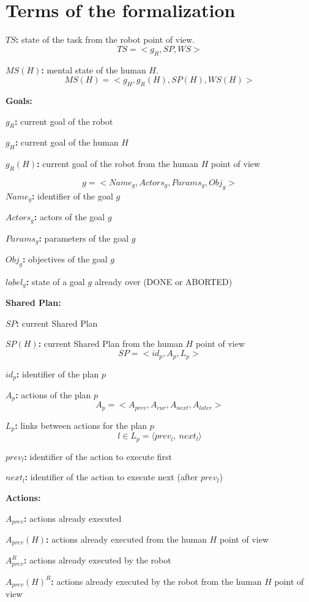 \chapter{Terms of the formalization}
\label{chap:annexe1}


\textbf{$TS$:} state of the task from the robot point of view.
$$TS = <g_R, SP, WS>$$

\textbf{$MS(H)$:} mental state of the human $H$.
$$MS(H) = <g_H, g_R(H), SP(H), WS(H)>$$

\textbf{Goals:}

\textbf{$g_R$:} current goal of the robot

\textbf{$g_H$:} current goal of the human $H$

\textbf{$g_R(H)$:} current goal of the robot from the human $H$ point of view

$$g = <Name_g, Actors_g, Params_g, Obj_g>$$
\textbf{$Name_g$:} identifier of the goal $g$

\textbf{$Actors_g$:} actors of the goal $g$

\textbf{$Params_g$:} parameters of the goal $g$

\textbf{$Obj_g$:} objectives of the goal $g$

\textbf{$label_g$:} state of a goal $g$ already over (DONE or ABORTED)


\textbf{Shared Plan:}

\textbf{$SP$:} current Shared Plan

\textbf{$SP(H)$:} current Shared Plan from the human $H$ point of view
$$SP = <id_p, A_p, L_p>$$

\textbf{$id_p$:} identifier of the plan $p$

\textbf{$A_p$:} actions of the plan $p$
$$A_p = <A_{prev}, A_{cur}, A_{next}, A_{later}>$$

\textbf{$L_p$:} links between actions for the plan $p$
 $$l \in L_p = \langle prev_l, \ next_l \rangle$$

\textbf{$prev_l$:} identifier of the action to execute first

\textbf{$next_l$:} identifier of the action to execute next (after $prev_l$)

\textbf{Actions:}

\textbf{$A_{prev}$:} actions already executed

\textbf{$A_{prev}(H)$:} actions already executed from the human $H$ point of view

\textbf{$A_{prev}^R$:} actions already executed by the robot

\textbf{$A_{prev}(H)^R$:} actions already executed by the robot from the human $H$ point of view

